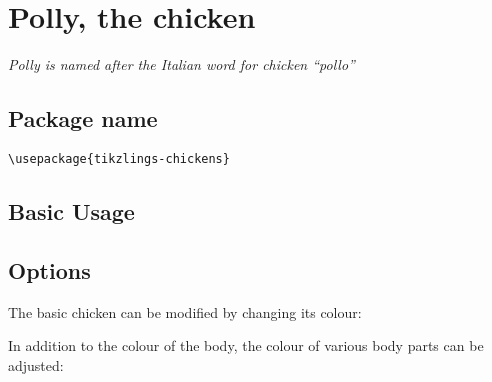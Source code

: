 \documentclass[parskip=half]{scrartcl}
\begin{document}
\section[Chicken]{Polly, the chicken}

\emph{Polly is named after the Italian word for chicken ``pollo''}

\subsection{Package name}

\begin{tcolorbox}[lower separated=false, lefthand width=.8\linewidth]
\vspace*{0.5cm}
\lstinline|\usepackage{tikzlings-chickens}| 
\vspace*{0.5cm}
\end{tcolorbox}

\subsection{Basic Usage}

\begin{tcblisting}{}
\chicken
\end{tcblisting}

\subsection{Options}

The basic chicken can be modified by changing its colour:
\begin{tcblisting}{}
\chicken[body=blue]
\end{tcblisting}

In addition to the colour of the body, the colour of various body parts can be adjusted:
\begin{tcblisting}{}
\chicken[comb=green]
\end{tcblisting}

\begin{tcblisting}{}
\chicken[eye=red]
\end{tcblisting}

\begin{tcblisting}{}
\chicken[pupil=red]
\end{tcblisting}

\begin{tcblisting}{}
\chicken[bill=red]
\end{tcblisting}

\begin{tcblisting}{}
\chicken[feet=red]
\end{tcblisting}
\end{document}
